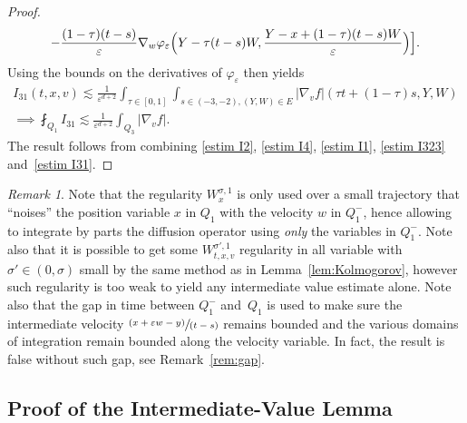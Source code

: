 \documentclass[11pt]{article}
\numberwithin{equation}{section}\let\oldbigcup\bigcup
\newcommand{\pspfrac}[2]{\sfrac{(#1)}{(#2)}}
\theoremstyle{definition}
\theoremstyle{remark}
\newtheorem{remark}[theorem]{Remark}
\let\var\varepsilon
\begin{document}
\begin{proof}
\begin{multline*}
-\frac{(1-\tau)(t-s)}{\var}\nabla_w\varphi_\var
\Bigl(Y-\tau (t-s)W,\frac{Y-x+(1-\tau)(t-s)W}{\varepsilon}
\Bigr)\Bigr].
\end{multline*}
Using the bounds on the derivatives of $\varphi_\var$ then
yields
\begin{multline}
I_{31}(t,x,v) \lesssim \frac{1}{ \varepsilon^{d+2}}
\int_{\tau \in [0,1]}\int_{s\in
(-3,-2), (Y,W)\in E} |\nabla_v f|\left(\tau
t+(1-\tau)s,Y,W\right) \\
\implies
\label{estim I31}
\fint_{Q_1} I_{31} \lesssim
\frac{1}{ \varepsilon^{d+2}} \int_{Q_3} |\nabla_v f|.
\end{multline}
The result follows from combining \eqref{estim I2},
\eqref{estim I4}, \eqref{estim I1}, \eqref{estim I323}
and~\eqref{estim I31}.
\end{proof}

\begin{remark}
Note that the regularity $W^{\sigma,1}_{x}$ is only used over a
small trajectory that ``noises'' the position variable $x$ in
$Q_1$ with the velocity $w$ in $Q_1^-$, hence allowing to
integrate by parts the diffusion operator using \emph{only} the
variables in $Q_1^-$. Note also that it is possible to get some
$W^{\sigma',1}_{t,x,v}$ regularity in all variable with
$\sigma' \in (0,\sigma)$ small by the same method as in
Lemma~\ref{lem:Kolmogorov}, however such regularity is too weak
to yield any intermediate value estimate alone. Note also that
the gap in time between $Q_1^-$ and~$Q_1$ is used to make sure
the intermediate velocity $\pspfrac{x+\var w-y}{t-s}$ remains
bounded and the various domains of integration remain bounded
along the velocity variable. In fact, the result is false
without such gap, see Remark~\ref{rem:gap}.
\end{remark}

\subsection{Proof of the Intermediate-Value Lemma}
\label{ss:proof-ivl}
\end{document}
